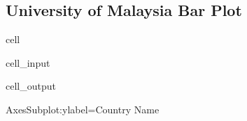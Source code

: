 \documentclass[letterpaper,10pt,english]{jupyterBook}
\begin{document}
\subsection{University of Malaysia Bar Plot}
\label{\detokenize{notebooks/data_exploration:university-of-malaysia-bar-plot}}
\begin{sphinxuseclass}{cell}\begin{sphinxVerbatimInput}

\begin{sphinxuseclass}{cell_input}
\begin{sphinxVerbatim}[commandchars=\\\{\}]
              
\end{sphinxVerbatim}

\end{sphinxuseclass}\end{sphinxVerbatimInput}
\begin{sphinxVerbatimOutput}

\begin{sphinxuseclass}{cell_output}
\begin{sphinxVerbatim}[commandchars=\\\{\}]
\PYGZlt{}AxesSubplot:ylabel=\PYGZsq{}Country Name\PYGZsq{}\PYGZgt{}
\end{sphinxVerbatim}

\noindent{}

\end{sphinxuseclass}\end{sphinxVerbatimOutput}

\end{sphinxuseclass}
\end{document}
